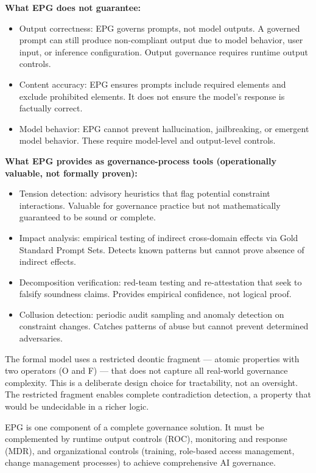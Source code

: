 \textbf{What EPG does not guarantee:}

\begin{itemize}
  \item Output correctness: EPG governs prompts, not model outputs. A governed prompt can still produce non-compliant output due to model behavior, user input, or inference configuration. Output governance requires runtime output controls.
  \item Content accuracy: EPG ensures prompts include required elements and exclude prohibited elements. It does not ensure the model's response is factually correct.
  \item Model behavior: EPG cannot prevent hallucination, jailbreaking, or emergent model behavior. These require model-level and output-level controls.
\end{itemize}


\textbf{What EPG provides as governance-process tools (operationally valuable, not formally proven):}

\begin{itemize}
  \item Tension detection: advisory heuristics that flag potential constraint interactions. Valuable for governance practice but not mathematically guaranteed to be sound or complete.
  \item Impact analysis: empirical testing of indirect cross-domain effects via Gold Standard Prompt Sets. Detects known patterns but cannot prove absence of indirect effects.
  \item Decomposition verification: red-team testing and re-attestation that seek to falsify soundness claims. Provides empirical confidence, not logical proof.
  \item Collusion detection: periodic audit sampling and anomaly detection on constraint changes. Catches patterns of abuse but cannot prevent determined adversaries.
\end{itemize}


The formal model uses a restricted deontic fragment --- atomic properties with two operators (O and F) --- that does not capture all real-world governance complexity. This is a deliberate design choice for tractability, not an oversight. The restricted fragment enables complete contradiction detection, a property that would be undecidable in a richer logic.

EPG is one component of a complete governance solution. It must be complemented by runtime output controls (ROC), monitoring and response (MDR), and organizational controls (training, role-based access management, change management processes) to achieve comprehensive AI governance.



